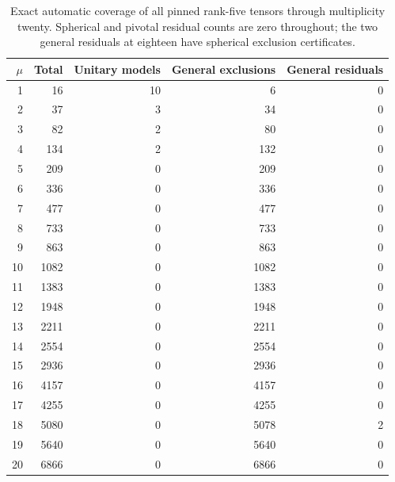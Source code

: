 \begin{table}[ht]\centering\small
\begin{tabular}{rrrrr}\toprule
$\mu$&Total&Unitary models&General exclusions&General residuals\\\midrule
1&16&10&6&0\\
2&37&3&34&0\\
3&82&2&80&0\\
4&134&2&132&0\\
5&209&0&209&0\\
6&336&0&336&0\\
7&477&0&477&0\\
8&733&0&733&0\\
9&863&0&863&0\\
10&1082&0&1082&0\\
11&1383&0&1383&0\\
12&1948&0&1948&0\\
13&2211&0&2211&0\\
14&2554&0&2554&0\\
15&2936&0&2936&0\\
16&4157&0&4157&0\\
17&4255&0&4255&0\\
18&5080&0&5078&2\\
19&5640&0&5640&0\\
20&6866&0&6866&0\\
\bottomrule\end{tabular}
\caption{Exact automatic coverage of all pinned rank-five tensors through multiplicity twenty. Spherical and pivotal residual counts are zero throughout; the two general residuals at eighteen have spherical exclusion certificates.}\label{tab:coverage}\end{table}
